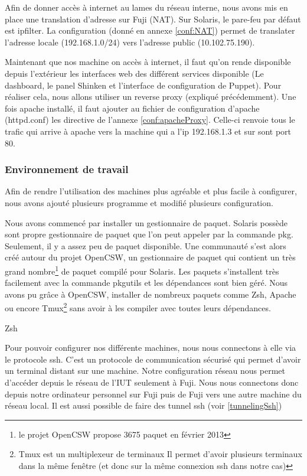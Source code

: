 \documentclass[a4paper,oneside]{report}
\begin{document}
Afin de donner accès à internet au lames du réseau interne, nous avons mis en place une translation d'adresse sur Fuji (NAT).
Sur Solaris, le pare-feu par défaut est ipfilter. La configuration (donné en annexe \ref{conf:NAT}) permet de translater l'adresse locale (192.168.1.0/24) vers l'adresse public (10.102.75.190).

Maintenant que nos machine on accès à internet, il faut qu'on rende disponible depuis l'extérieur les interfaces web des différent services disponible (Le dashboard, le panel Shinken et l'interface de configuration de Puppet).
Pour réaliser cela, nous allons utiliser un reverse proxy (expliqué précédemment). Une fois apache installé, il faut ajouter au fichier de configuration d'apache (httpd.conf) les directive de l'annexe \ref{conf:apacheProxy}.
Celle-ci renvoie tous le trafic qui arrive à apache vers la machine qui a l'ip 192.168.1.3 et sur sont port 80.

\subsubsection{Environnement de travail}
Afin de rendre l'utilisation des machines plus agréable et plus facile à configurer, nous avons ajouté plusieurs programme et modifié plusieurs configuration.

Nous avons commencé par installer un gestionnaire de paquet.
Solaris possède sont propre gestionnaire de paquet que l'on peut appeler par la commande pkg. Seulement, il y a assez peu de paquet disponible.
Une communauté s'est alors créé autour du projet OpenCSW, un gestionnaire de paquet qui contient un très grand nombre\footnote{le projet OpenCSW propose 3675 paquet en février 2013} de paquet compilé pour Solaris.
Les paquets s'installent très facilement avec la commande pkgutils et les dépendances sont bien géré. Nous avons pu grâce à OpenCSW, installer de nombreux paquets comme Zsh, Apache ou encore Tmux\footnote{Tmux est un multiplexeur de terminaux
Il permet d'avoir plusieurs terminaux dans la même fenêtre (et donc sur la même connexion \gls{ssh} dans notre cas)} sans avoir à les compiler avec toutes leurs dépendances. 


Zsh


Pour pouvoir configurer nos différente machines, nous nous connectons à elle via le protocole \gls{ssh}. 
C'est un protocole de communication sécurisé qui permet d'avoir un terminal distant sur une machine.
Notre configuration réseau nous permet d'accéder depuis le réseau de l'IUT seulement à Fuji.
Nous nous connectons donc depuis notre ordinateur personnel sur Fuji puis de Fuji vers une autre machine du réseau local.
Il est aussi possible de faire des tunnel \gls{ssh} (voir \ref{tunnelingSsh})
\end{document}
